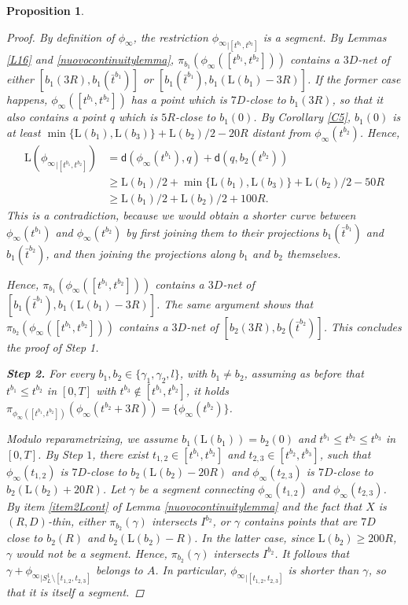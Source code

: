 \documentclass[10pt]{article}
\newtheorem{proposition}[thm]{Proposition}
\theoremstyle{definition}
\newcommand{\length}{\mathrm{L}}
\newcommand{\sd}{\mathsf{d}}
\begin{document}
\begin{proposition}
\begin{proof}
        By definition of $\phi_\infty$, the restriction ${\phi_\infty}_{|[t^{b_1},t^{b_2}]}$ is a segment. By Lemmas \ref{L16} and \ref{nuovocontinuitylemma}, $\pi_{b_1}({\phi_\infty}([t^{b_1},t^{b_2}]))$ contains a $3D$-net of either $[b_1(3R),b_1(\bar{t}^{b_1})]$ or $[b_1(\bar{t}^{b_1}), b_1(\length(b_1)-3R)]$.
        If the former case happens, ${\phi_\infty}([t^{b_1},t^{b_2}])$ has a point which is $7D$-close to $b_1(3R)$, so that it also contains a point $q$ which is $5R$-close to $b_1(0)$. 
        By Corollary \ref{C5}, $b_1(0)$ is at least $\min\{\length(b_1), \length(b_3)\}+\length(b_2)/2-20R$ distant from $\phi_\infty(t^{b_2})$. Hence,
        \begin{align*}
        \length({\phi_\infty}_{|[t^{b_1},t^{b_2}]}) & = \sd(\phi_\infty(t^{b_1}),q)+\sd(q,b_2(t^{b_2})) \\
        &\geq \length(b_1)/2+\min\{\length(b_1), \length(b_3)\}+\length(b_2)/2-50R
        \\
        & \geq \length(b_1)/2+\length(b_2)/2+100R.
        \end{align*}
        This is a contradiction, because we would obtain a shorter curve between $\phi_\infty(t^{b_1})$ and $\phi_\infty(t^{b_2})$ by first joining them to their projections $b_1(\bar{t}^{b_1})$ and $b_1(\bar{t}^{b_2})$, and then joining the projections along $b_1$ and $b_2$ themselves.
        
        Hence, $\pi_{b_1}({\phi_\infty}([t^{b_1},t^{b_2}]))$ contains a $3D$-net of $[b_1(\bar{t}^{b_1}), b_1(\length(b_1)-3R)]$. The same argument shows that $\pi_{b_2}({\phi_\infty}([t^{b_1},t^{b_2}]))$ contains a $3D$-net of $[b_2(3R),b_2(\bar{t}^{b_2})]$. This concludes the proof of Step 1.

        \textbf{Step 2.} For every $b_1,b_2 \in \{\gamma_1,\gamma_2,l\}$, with $b_1 \neq b_2$, assuming as before that $t^{b_1} \leq t^{b_2}$ in $[0,T]$ with $t^{b_3} \notin [t^{b_1},t^{b_2}]$, it holds $\pi_{\phi_\infty([t^{b_1},t^{b_2}])}(\phi_\infty(t^{b_2}+3R)) =\{\phi_\infty(t^{b_2})\}$.

        Modulo reparametrizing, we assume $b_1(\length(b_1))=b_2(0)$ and $t^{b_1} \leq t^{b_2} \leq t^{b_3}$ in $[0,T]$.
        By Step $1$, there exist $t_{1,2} \in [t^{b_1},t^{b_2}]$ and $t_{2,3} \in [t^{b_2},t^{b_3}]$, such that $\phi_\infty(t_{1,2})$ is $7D$-close to $b_2(\length(b_2)-20R)$ and $\phi_\infty(t_{2,3})$ is $7D$-close to $b_2(\length(b_2)+20R)$. Let $\gamma$ be a segment connecting $\phi_\infty(t_{1,2})$ and $\phi_\infty(t_{2,3})$. By item \ref{item2Lcont} of Lemma \ref{nuovocontinuitylemma} and the fact that $X$ is $(R,D)$-thin, either $\pi_{b_2}(\gamma)$ intersects $I^{b_2}$, or $\gamma$ contains points that are $7D$ close to $b_2(R)$ and $b_2(\length(b_2)-R)$. In the latter case, since $\length(b_2) \geq 200R$, $\gamma$ would not be a segment. Hence, $\pi_{b_2}(\gamma)$ intersects $I^{b_2}$. It follows that $\gamma + {\phi_\infty}_{|S^1_L \setminus [t_{1,2},t_{2,3}]}$ belongs to $A$. In particular, ${\phi_\infty}_{|[t_{1,2},t_{2,3}]}$ is shorter than $\gamma$, so that it is itself a segment.


\end{proof}
\end{proposition}
\end{document}
